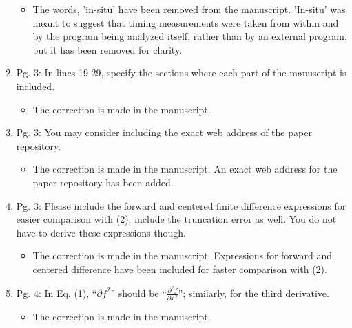\documentclass{article}
\begin{document}
\begin{enumerate}
{\color{red}  
\begin{itemize}
     \item
         
      The words, 'in-situ' have been removed from the manuscript. 'In-situ' was
      meant to suggest that timing measurements were taken from within and by
      the program being analyzed itself, rather than by an external program,
      but it has been removed for clarity.

  \end{itemize}}
	
  \item 
	Pg. 3: In lines 19-29, specify the sections where each part of the manuscript is
included.

{\color{red}  
\begin{itemize}
     \item
      The correction is made in the manuscript.
  \end{itemize}}

  \item 
Pg. 3: You may consider including the exact web address of the paper repository.

{\color{red}  
\begin{itemize}
     \item
      The correction is made in the manuscript. An exact web address for the paper repository has been added.
  \end{itemize}}

  \item 
    Pg. 3: Please include the forward and centered ﬁnite difference expressions for
    easier comparison with (2); include the truncation error as well. You do not
    have to derive these expressions though.

{\color{red}  
\begin{itemize}
     \item
      The correction is made in the manuscript. Expressions for forward and centered difference have been included for faster comparison with (2).  
  \end{itemize}}

  \item 
Pg. 4: In Eq. (1), “$\partial f^2$” should be “$\frac{\partial^2 f}{\partial x^2}$”; similarly, for the third derivative.

{\color{red}  
\begin{itemize}
     \item
      The correction is made in the manuscript.
  \end{itemize}}


\end{enumerate}
\end{document}
